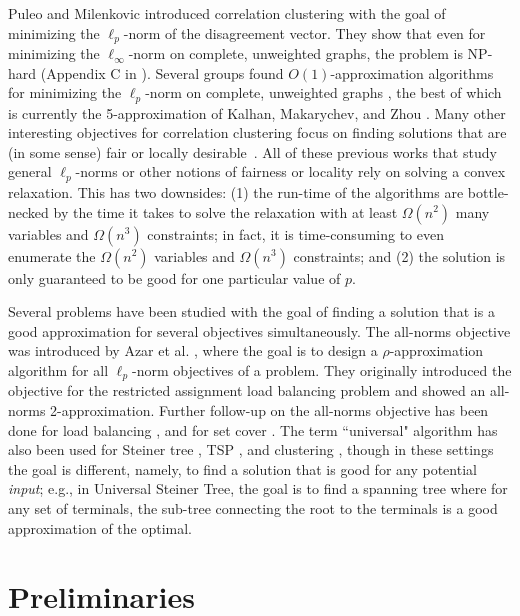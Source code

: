 \documentclass[11pt]{article}
\begin{document}
Puleo and Milenkovic \citeyearpar{PM16} introduced correlation clustering
with the goal of minimizing the $\ell_p$-norm of the disagreement vector.
They show that even for minimizing the $\ell_\infty$-norm on complete, unweighted graphs, the problem is \textsf{NP}-hard (Appendix C in \cite{PM16}).
Several groups found $O(1)$-approximation algorithms for minimizing the $\ell_p$-norm on complete, unweighted graphs \cite{PM16, CGS17, KMZ19}, the best of which is currently the 5-approximation of Kalhan, Makarychev, and Zhou \citeyearpar{KMZ19}.
Many other interesting objectives for correlation clustering focus on finding solutions that are (in some sense) fair or locally desirable~\cite{ahmadian2020fair, bateni2022scalable, ahmadi2020fair, friggstad2021fair, jafarov2021local, Khuller2019min}.
All of these previous works that study general $\ell_p$-norms or other notions of fairness or locality rely on solving a convex relaxation. 
This has two downsides: (1) the run-time of the algorithms are bottle-necked by the time it takes to solve the relaxation with at least $\Omega(n^2)$ many variables and $\Omega(n^3)$ constraints; in fact, it is time-consuming to even enumerate the $\Omega(n^2)$ variables and $\Omega(n^3)$ constraints; and (2) the solution is only guaranteed to be good for one particular value of $p$. 

 Several problems have been studied with the goal of finding a solution 
that is a good approximation for several objectives simultaneously.
The all-norms objective was introduced by Azar et al. \cite{azar2004all}, where the goal is to design a $\rho$-approximation algorithm for all $\ell_p$-norm objectives of a problem. 
They originally introduced the objective for the restricted assignment load balancing problem 
and showed an all-norms 2-approximation.
Further follow-up on the all-norms objective has been done for load balancing \cite{kleinberg1999fairness, bernstein2017simultaneously, langley2020improved}, and for set cover \cite{golovin2008all}.
The term ``universal" algorithm has also been used for Steiner tree \cite{busch2012split, busch2023one}, TSP \cite{jia2005universal}, and clustering \cite{ganesh2023universal}, 
though in these settings the goal is different, namely, to find a solution that is good for any potential \textit{input}; e.g., in Universal Steiner Tree, the goal is to find a spanning tree where for any set of terminals, the sub-tree connecting the root to the terminals is a good approximation of the optimal.


\section{Preliminaries}
\end{document}
